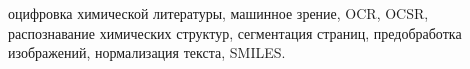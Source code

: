 оцифровка химической литературы, машинное зрение, OCR, OCSR, распознавание химических структур, сегментация страниц, предобработка изображений, нормализация текста, SMILES.
